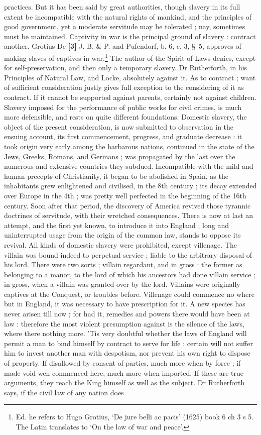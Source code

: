 \documentclass[a4paper]{article}
\begin{document}
practices. But it has been said by great authorities, though slavery in its full extent be incompatible with the natural rights of mankind, and the principles of good government, yet a moderate servitude may be tolerated ; nay, sometimes must be maintained. Captivity in war is the principal ground of slavery : contract another. Grotius De \textbf{[3]} J. B. \& P. and Pufendorf, b. 6, c. 3, \S\ 5, approves of making slaves of captives in war.\footnote{Ed. he refers to Hugo Grotius, `De jure belli ac pacis' (1625) book 6 ch 3 s 5. The Latin translates to `On the law of war and peace'.} The author of the Spirit of Laws denies, except for self-preservation, and then only a temporary slavery. Dr Rutherforth, in his Principles of Natural Law, and Locke, absolutely against it. As to contract ; want of sufficient consideration justly gives full exception to the considering of it as contract. If it cannot be supported against parents, certainly not against children. Slavery imposed for the performance of public works for civil crimes, is much more defensible, and rests on quite different foundations. Domestic slavery, the object of the present consideration, is now submitted to observation in the ensuing account, its first commencement, progress, and graduate decrease : it took origin very early among the barbarous nations, continued in the state of the Jews, Greeks, Romans, and Germans ; was propagated by the last over the numerous and extensive countries they subdued. Incompatible with the mild and human precepts of Christianity, it began to be abolished in Spain, as the inhabitants grew enlightened and civilised, in the 8th century ; its decay extended over Europe in the 4th ; was pretty well perfected in the beginning of the 16th century. Soon after that period, the discovery of America revived those tyrannic doctrines of servitude, with their wretched consequences. There is now at last an attempt, and the first yet known, to introduce it into England ; long and uninterrupted usage from the origin of the common law, stands to oppose its revival. All kinds of domestic slavery were prohibited, except villenage. The villain was bound indeed to perpetual service ; liable to the arbitrary disposal of his lord. There were two sorts ; villain regardant, and in gross : the former as belonging to a manor, to the lord of which his ancestors had done villain service ; in gross, when a villain was granted over by the lord. Villains were originally captives at the Conquest, or troubles before. Villenage could commence no where but in England, it was necessary to have prescription for it. A new species has never arisen till now ; for had it, remedies and powers there would have been at law : therefore the most violent presumption against is the silence of the laws, where there nothing more. 'Tis very doubtful whether the laws of England will permit a man to bind himself by contract to serve for life : certain will not suffer him to invest another man with despotism, nor prevent his own right to dispose of property. If disallowed by consent of parties, much more when by force ; if made void wen commenced here,  much more when imported. If these are true arguments, they reach the King himself as well as the subject. Dr Rutherforth says, if the civil law of any nation does 
\end{document}

